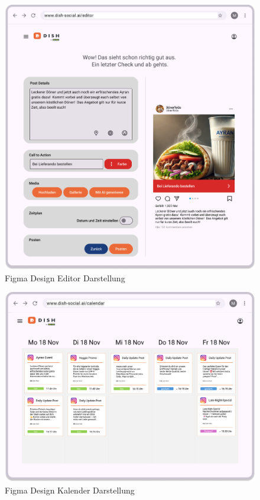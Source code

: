 \begin{figure}[htbp]
    \centering
    \includegraphics[width=\textwidth]{abbildungen/figma/Editor}
    \caption[]{Figma Design Editor Darstellung}
    \label{fig:editor-page}
\end{figure}
\newpage

\begin{figure}[htbp]
    \centering
    \includegraphics[width=\textwidth]{abbildungen/figma/Kalender}
    \caption[]{Figma Design Kalender Darstellung}
    \label{fig:calendar-page}
\end{figure}